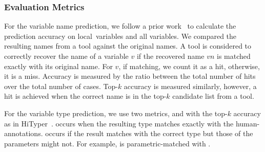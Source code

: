 \subsubsection*{Evaluation Metrics}

For the variable name prediction, we follow a prior work~\cite{icse19}
to calculate the prediction accuracy on local~variables and all
variables. We compared the resulting names from a tool against the
original names. A tool is considered to correctly
recover the name of a variable $v$ if the recovered name $vn$ is
matched exactly with its original name. For $v$, if matching, we count
it as a hit, otherwise, it is a miss. Accuracy is measured by the
ratio between the total number of hits over the total number of
cases. Top-$k$ accuracy is measured similarly, however, a hit is
achieved when the correct name is in the top-$k$ candidate list from a
tool.

For the variable type prediction, we use two metrics,
 and  with the top-$k$
accuracy as in HiTyper~\cite{HiTyper-icse22}. 
occurs when the resulting type matches exactly with the
human-annotations.  occurs if the result
matches with the correct type but those of the parameters might
not. For example,  is 
parametric-matched with .


